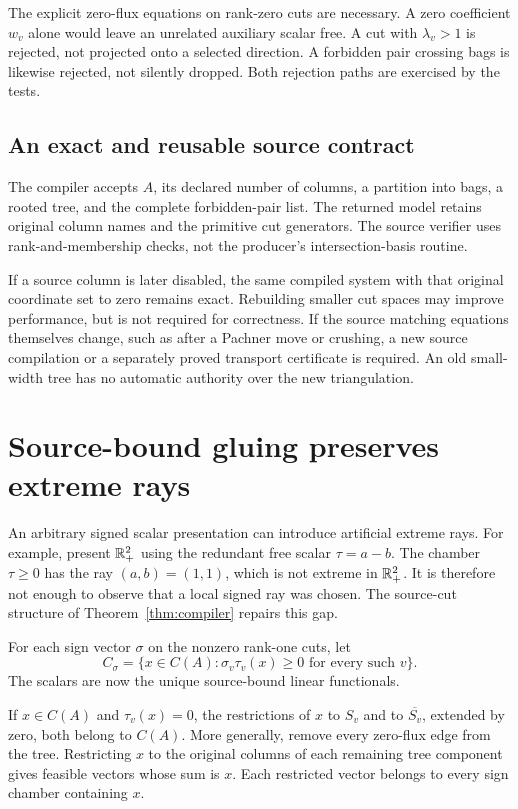 \begin{remark}
The explicit zero-flux equations on rank-zero cuts are necessary. A zero
coefficient $w_v$ alone would leave an unrelated auxiliary scalar free. A cut
with $\lambda_v>1$ is rejected, not projected onto a selected direction. A
forbidden pair crossing bags is likewise rejected, not silently dropped.
Both rejection paths are exercised by the tests.
\end{remark}

\subsection{An exact and reusable source contract}

The compiler accepts $A$, its declared number of columns, a partition into bags,
a rooted tree, and the complete forbidden-pair list. The returned model retains
original column names and the primitive cut generators. The source verifier
uses rank-and-membership checks, not the producer's intersection-basis routine.

If a source column is later disabled, the same compiled system with that
original coordinate set to zero remains exact. Rebuilding smaller cut spaces
may improve performance, but is not required for correctness. If the source
matching equations themselves change, such as after a Pachner move or crushing,
a new source compilation or a separately proved transport certificate is
required. An old small-width tree has no automatic authority over the new
triangulation.

\section{Source-bound gluing preserves extreme rays}
\label{sec:extreme}

An arbitrary signed scalar presentation can introduce artificial extreme rays.
For example, present $\mathbb R_+^2$ using the redundant free scalar $\tau=a-b$.
The chamber $\tau\geq0$ has the ray $(a,b)=(1,1)$, which is not extreme in
$\mathbb R_+^2$. It is therefore not enough to observe that a local signed ray was
chosen. The source-cut structure of Theorem~\ref{thm:compiler} repairs this gap.

For each sign vector $\sigma$ on the nonzero rank-one cuts, let
\[
 C_\sigma=\{x\in C(A):\sigma_v\tau_v(x)\geq0\text{ for every such }v\}.
\]
The scalars are now the unique source-bound linear functionals.

\begin{lemma}
\label{lem:zerosplit}
If $x\in C(A)$ and $\tau_v(x)=0$, the restrictions of $x$ to $S_v$ and to
$\overline{S_v}$, extended by zero, both belong to $C(A)$. More generally,
remove every zero-flux edge from the tree. Restricting $x$ to the original
columns of each remaining tree component gives feasible vectors whose sum
is $x$. Each restricted vector belongs to every sign chamber containing $x$.
\end{lemma}

